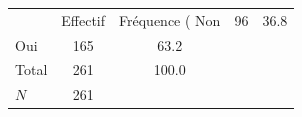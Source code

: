 {
\def\sym#1{\ifmmode^{#1}\else\(^{#1}\)\fi}
\begin{tabular}{l*{1}{cc}}
\toprule
            &    Effectif&Fréquence (%
\midrule
Non         &          96&        36.8\\
Oui         &         165&        63.2\\
Total       &         261&       100.0\\
\midrule
\(N\)       &         261&            \\
\bottomrule
\end{tabular}
}
